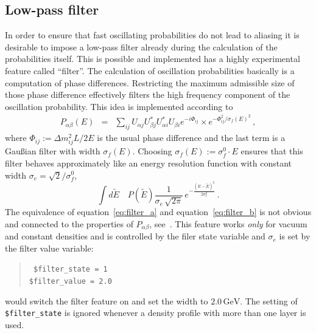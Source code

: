 \subsection{Low-pass filter}

In order to ensure that fast oscillating probabilities do not lead to 
aliasing
it is desirable to impose a low-pass filter already during the calculation
of the probabilities itself. This is possible and implemented has a highly
experimental feature called ``filter''. 
The calculation of oscillation
probabilities basically is a computation of phase differences. Restricting
the maximum admissible size of those phase difference effectively filters
the high frequency component of the oscillation probability. This idea is
implemented according to
\begin{eqnarray}
\label{eq:filter_a}
P_{\alpha\beta}(E)&=&\sum_{ij}
U_{\alpha j} U^*_{\beta j} U^*_{\alpha i} U_{\beta i} 
e^{-i\Phi_{ij}}\times 
e^{ -\Phi_{ij}^2/\sigma_f(E)^2 }\,,
\end{eqnarray}
where $\Phi_{ij}:=\Delta m_{ij}^2 L/2E$ is the usual phase difference and
the last term is a Gau\ss ian filter with width $\sigma_f(E)$. Choosing
$\sigma_f(E):=\sigma_f^0 \cdot E$ ensures that this filter behaves 
approximately like an energy resolution function with constant width 
$\sigma_e=\sqrt{2}/\sigma_f^0$, \ie\
\begin{equation}
\label{eq:filter_b}
\int d\tilde E\quad P(\tilde E) \frac{1}{\sigma_e\,\sqrt{2\pi}}\,
e^{-\frac{(E-\tilde E)^2}{2\sigma^2_e}}\,.
\end{equation}
The equivalence of equation~\ref{eq:filter_a} and equation~\ref{eq:filter_b}
is not obvious and connected to the properties of $P_{\alpha\beta}$, 
see~\cite{Kiers:1996zj,Giunti:2003ax}. This feature works \emph{only} 
for vacuum and constant densities and is controlled
by the filer state variable and $\sigma_e$ is set by the filter value 
variable:
\begin{quote}
{\tt
\$filter\_state = 1\\
\$filter\_value = 2.0\\
}
\end{quote}
would switch the filter feature on and set the width to $2.0\,\mathrm{GeV}$.
The setting of {\tt \$filter\_state} is ignored whenever a density profile
with more than one layer is used. 

